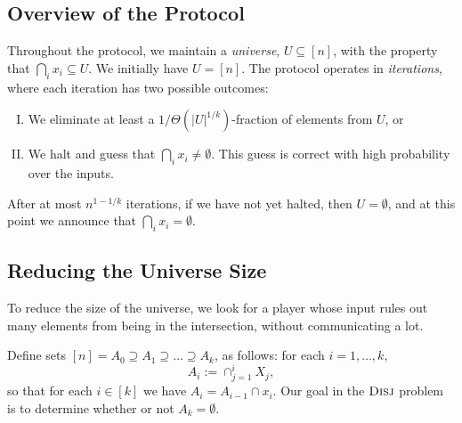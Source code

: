 \documentclass{article}
\newcommand{\coloneq}{:=}
\newcommand{\prob}[1]{\ensuremath{\text{\textsc{#1}}}}
\theoremstyle{plain}
\begin{document}
\subsection{Overview of the Protocol}
Throughout the protocol, we maintain a \emph{universe}, $U \subseteq [n]$,
with the property that $\bigcap_i x_i \subseteq U$.
We initially have $U = [n]$.
The protocol operates in \emph{iterations}, where each iteration has two possible outcomes:
\begin{enumerate}[I.]
  \item We eliminate at least a $1/\Theta(|U|^{1/k})$-fraction of elements from $U$, or
  \item We halt and guess that $\bigcap_i x_i \neq \emptyset$. This guess is correct with high probability over the inputs.
\end{enumerate}
After at most $n^{1 - 1/k}$ iterations, if we have not yet halted,
then $U = \emptyset$, and at this point we announce that $\bigcap_i x_i = \emptyset$.

\subsection{Reducing the Universe Size}
To reduce the size of the universe, we look for a player whose input rules out many elements from being in the intersection,
without communicating a lot.

Define sets $[n] = A_0 \supseteq A_1 \supseteq \ldots \supseteq A_k$, as follows:
for each $i = 1,\ldots,k$,
\begin{equation*}
  A_i \coloneq \cap_{j = 1}^i X_j,
\end{equation*}
so that for each $i \in [k]$ we have $A_i = A_{i-1} \cap x_i$.
Our goal in the $\prob{Disj}$ problem is to determine whether or not $A_k = \emptyset$.
\end{document}
